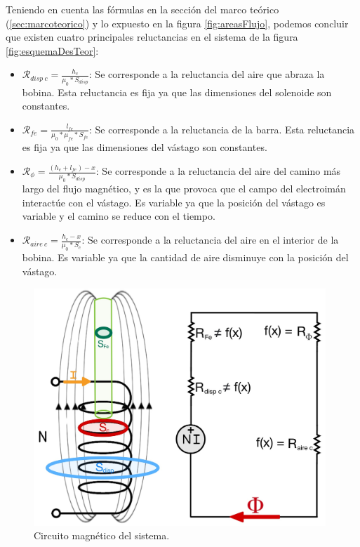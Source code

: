 Teniendo en cuenta las fórmulas en la sección del marco teórico (\ref{sec:marcoteorico}) y lo expuesto en la figura \ref{fig:areasFlujo}, podemos concluir que existen cuatro principales reluctancias en el sistema de la figura \ref{fig:esquemaDesTeor}:

\begin{itemize}
    \item \(\mathcal{R}_{disp~c}=\frac{h_c}{\mu_0*S_{disp}}\): Se corresponde a la reluctancia del aire que abraza la bobina. Esta reluctancia es fija ya que las dimensiones del solenoide son constantes.
    \item \(\mathcal{R}_{fe}=\frac{l_{fe}}{\mu_0*\mu_{fe}*S_{fe}}\): Se corresponde a la reluctancia de la barra. Esta reluctancia es fija ya que las dimensiones del vástago son constantes.
    \item \(\mathcal{R}_{\phi}=\frac{(h_c+l_{fe})-x}{\mu_0*S_{disp}}\): Se corresponde a la reluctancia del aire del camino más largo del flujo magnético, y es la que provoca que el campo del electroimán interactúe con el vástago. Es variable ya que la posición del vástago es variable y el camino se reduce con el tiempo.
    \item \(\mathcal{R}_{aire~c}=\frac{h_c-x}{\mu_0*S_c}\): Se corresponde a la reluctancia del aire en el interior de la bobina. Es variable ya que la cantidad de aire disminuye con la posición del vástago.
\end{itemize}

\begin{figure}[H]
    \centering
    \includegraphics[width=11cm]{FigurasMemoria/circuitoMag.jpg}
    \caption{Circuito magnético del sistema.}
    \label{fig:circuitoMag} %
\end{figure}


